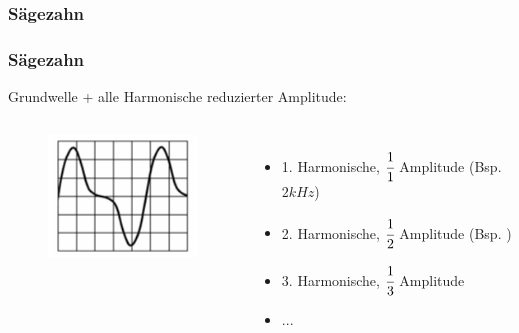 \subsubsection{Sägezahn}

\begin{frame}
  \frametitle{Sägezahn}

  Grundwelle + alle Harmonische reduzierter Amplitude:


  \begin{columns}
    \begin{center}
      \begin{figure}
        \includegraphics[width=\textwidth,height=0.6\textheight,keepaspectratio]{a11/TB705.png}
      \end{figure}
    \end{center}
    \begin{itemize}
      \item 1. Harmonische, $\cfrac{1}{1}$ Amplitude (Bsp. $2kHz$)
      \item 2. Harmonische, $\cfrac{1}{2}$ Amplitude (Bsp. )
      \item 3. Harmonische, $\cfrac{1}{3}$ Amplitude
      \item ...
    \end{itemize}
  \end{columns}
\end{frame}

